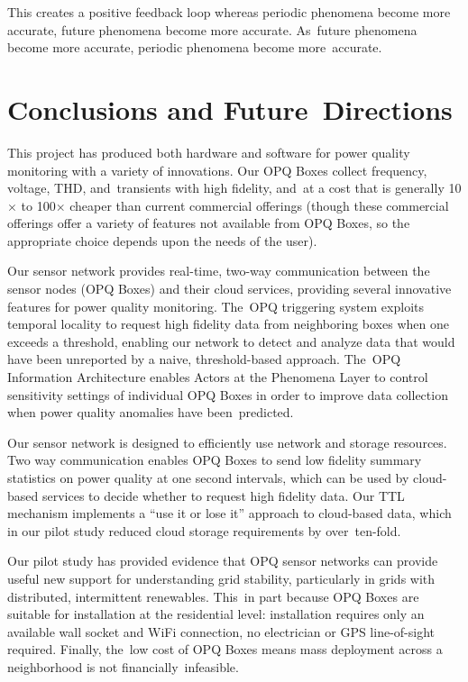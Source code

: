 \documentclass[energies,article,accept,moreauthors,pdftex]{Definitions/mdpi}
\begin{document}
This creates a positive feedback loop whereas periodic phenomena become more accurate, future phenomena become more accurate. As~future phenomena become more accurate, periodic phenomena become more~accurate.






\section{Conclusions and Future~Directions}
\label{sec:conclusions}

This project has produced both hardware and software for power quality monitoring with a variety of innovations. Our OPQ Boxes collect frequency, voltage, THD, and~transients with high fidelity, and~at a cost that is generally 10$\times$ to 100$\times$ cheaper than current commercial offerings (though these commercial offerings offer a variety of features not available from OPQ Boxes, so the appropriate choice depends upon the needs of the user).

Our sensor network provides real-time, two-way communication between the sensor nodes (OPQ Boxes) and their cloud services, providing several innovative features for power quality monitoring. The~OPQ triggering system exploits temporal locality to request high fidelity data from neighboring boxes when one exceeds a threshold, enabling our network to detect and analyze data that would have been unreported by a naive, threshold-based approach. The~OPQ Information Architecture enables Actors at the Phenomena Layer to control sensitivity settings of individual OPQ Boxes in order to improve data collection when power quality anomalies have been~predicted.

Our sensor network is designed to efficiently use network and storage resources. Two way communication enables OPQ Boxes to send low fidelity summary statistics on power quality at one second intervals, which can be used by cloud-based services to decide whether to request high fidelity data. Our TTL mechanism implements a “use it or lose it” approach to cloud-based data, which in our pilot study reduced cloud storage requirements by over~ten-fold.

Our pilot study has provided evidence that OPQ sensor networks can provide useful new support for understanding grid stability, particularly in grids with distributed, intermittent renewables. This~in part because OPQ Boxes are suitable for installation at the residential level: installation requires only an available wall socket and WiFi connection, no electrician or GPS line-of-sight required. Finally, the~low cost of OPQ Boxes means mass deployment across a neighborhood is not financially~infeasible.
\end{document}
